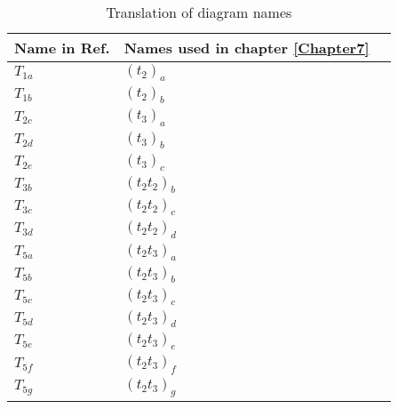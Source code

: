 \begin{table}[h]
\caption{Translation of diagram names}
\begin{center}
\begin{threeparttable}
\begin{tabular}{l l l}
    \toprule
Name in Ref.\cite{ShavittBartlett2009} & Names used in chapter \ref{Chapter7} \\ \hline 
$T_{1a}$ & $(t_2)_a$ \\
$T_{1b}$ & $(t_2)_b$ \\ \hline
$T_{2c}$ & $(t_3)_a$\\
$T_{2d}$ & $(t_3)_b$\\
$T_{2e}$ & $(t_3)_c$\\ \hline
$T_{3b}$ & $(t_2t_2)_b$\\
$T_{3c}$ & $(t_2t_2)_c$\\
$T_{3d}$ & $(t_2t_2)_d$\\ \hline
$T_{5a}$ & $(t_2t_3)_a$\\
$T_{5b}$ &$(t_2t_3)_b$ \\
$T_{5c}$ & $(t_2t_3)_c$\\
$T_{5d}$ &$(t_2t_3)_d$ \\
$T_{5e}$ & $(t_2t_3)_e$\\
$T_{5f}$ &$(t_2t_3)_f$ \\
$T_{5g}$ &$(t_2t_3)_g$ \\
\bottomrule
\end{tabular}
\begin{tablenotes}
\end{tablenotes}
\end{threeparttable}
\end{center}
\label{tab:diagramtranslation}
\end{table}
